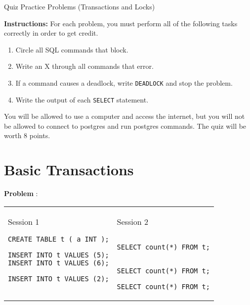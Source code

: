 \documentclass[10pt]{article}
\theoremstyle{definition}
\newcounter{ProblemCounter}
\newcommand{\nextproblem}{\filbreak\stepcounter{ProblemCounter} \noindent\textbf{Problem \theProblemCounter}:}
\begin{document}
\begin{center}
{
\Large
    Quiz Practice Problems (Transactions and Locks)
}

    \vspace{0.1in}
\end{center}

\noindent
\textbf{Instructions:}
For each problem, you must perform all of the following tasks correctly in order to get credit.
\begin{enumerate}
\item Circle all SQL commands that block.
\item Write an X through all commands that error.
\item If a command causes a deadlock, write \lstinline{DEADLOCK} and stop the problem.
\item Write the output of each \lstinline{SELECT} statement.
\end{enumerate}
    You will be allowed to use a computer and access the internet, but you will not be allowed to connect to postgres and run postgres commands.
    The quiz will be worth 8 points.

\section{Basic Transactions}

\nextproblem
\begin{tcolorbox}
\begin{tabular}{p{3.25in}p{3in}}
\hspace{-0.2in}Session 1
\begin{lstlisting}
CREATE TABLE t ( a INT );

INSERT INTO t VALUES (5);
INSERT INTO t VALUES (6);

INSERT INTO t VALUES (2);
  
\end{lstlisting}
    &
\hspace{-0.2in}Session 2
\begin{lstlisting}

SELECT count(*) FROM t;


SELECT count(*) FROM t;

SELECT count(*) FROM t;
\end{lstlisting}
\end{tabular}
\vspace{-0.2in}
\end{tcolorbox}
\vspace{0.25in}
\end{document}
